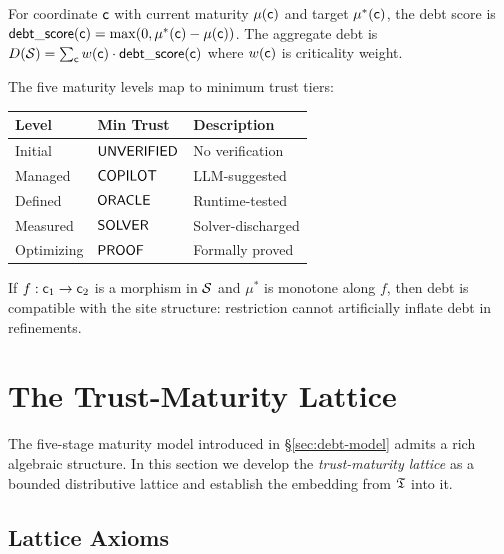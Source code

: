 \documentclass[11pt]{article}
\newcommand{\DebtScore}{\mathsf{debt\_score}}
\begin{document}
\begin{definition}\label{def:debt-score}
For coordinate $\mathsf{c}$ with current maturity $\mu(\mathsf{c})$ and target
$\mu^*(\mathsf{c})$, the debt score is
$\DebtScore(\coord) = \max(0, \mu^*(\coord) - \mu(\coord))$.
The aggregate debt is $D(\Site) = \sum_{\coord} w(\coord) \cdot
\DebtScore(\coord)$ where $w(\mathsf{c})$ is criticality weight.
\end{definition}

The five maturity levels map to minimum trust tiers:
\begin{center}
\begin{tabular}{lll}
\toprule
\textbf{Level} & \textbf{Min Trust} & \textbf{Description} \\
\midrule
\textsf{Initial}    & $\mathsf{UNVERIFIED}$   & No verification \\
\textsf{Managed}    & $\mathsf{COPILOT}$ & LLM-suggested \\
\textsf{Defined}    & $\mathsf{ORACLE}$  & Runtime-tested \\
\textsf{Measured}   & $\mathsf{SOLVER}$  & Solver-discharged \\
\textsf{Optimizing} & $\mathsf{PROOF}$   & Formally proved \\
\bottomrule
\end{tabular}
\end{center}

\begin{proposition}\label{prop:debt-mono}
If $f : \mathsf{c}_1 \to \mathsf{c}_2$ is a morphism in $\mathcal{S}$ and $\mu^*$
is monotone along $f$, then debt is compatible with the site structure:
restriction cannot artificially inflate debt in refinements.
\end{proposition}

\section{The Trust-Maturity Lattice}\label{sec:trust-maturity-lattice}

The five-stage maturity model introduced in \S\ref{sec:debt-model}
admits a rich algebraic structure.  In this section we develop the
\emph{trust-maturity lattice} as a bounded distributive lattice and
establish the embedding from $\mathfrak{T}$ into it.

\subsection{Lattice Axioms}\label{subsec:lattice-axioms}
\end{document}
